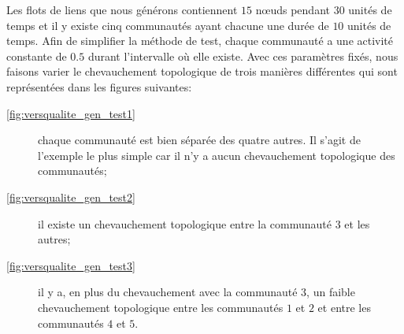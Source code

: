 Les flots de liens que nous générons contiennent $15$ n\oe{}uds pendant $30$ unités de temps et il y existe cinq communautés ayant chacune une durée de $10$ unités de temps.
Afin de simplifier la méthode de test, chaque communauté a une activité constante de $0.5$ durant l'intervalle où elle existe.
Avec ces paramètres fixés, nous faisons varier le chevauchement topologique de trois manières différentes qui sont représentées dans les figures suivantes:

\begin{description}
\item[\ref{fig:versqualite_gen_test1}] chaque communauté est bien séparée des quatre autres. Il s'agit de l'exemple le plus simple car il n'y a aucun chevauchement topologique des communautés;
\item[\ref{fig:versqualite_gen_test2}] il existe un chevauchement topologique entre la communauté $3$ et les autres;
\item[\ref{fig:versqualite_gen_test3}] il y a, en plus du chevauchement avec la communauté $3$, un faible chevauchement topologique entre les communautés $1$ et $2$ et entre les communautés $4$ et $5$.
\end{description}


